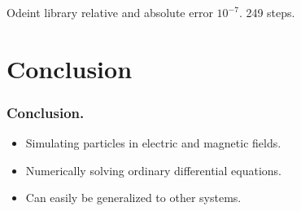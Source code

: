 \documentclass{beamer}
\begin{document}
\begin{frame}
\begin{centering}
{Odeint library relative and absolute error $10^{-7}$. 249 steps.
}%
%
%



\end{centering}
\end{frame}



\section{Conclusion}

\begin{frame}
\frametitle{Conclusion.}
\begin{itemize}
\item<1-> Simulating particles in electric and magnetic fields.
\item<2-> Numerically solving ordinary differential equations.
\item<2-> Can easily be generalized to other systems.
\end{itemize}
\end{frame}
\end{document}
